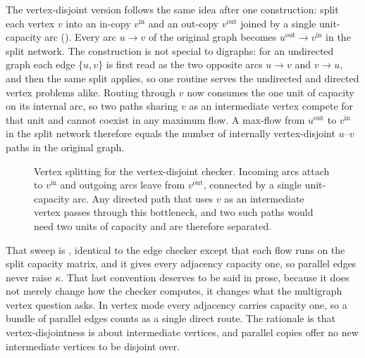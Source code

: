 The vertex-disjoint version follows the same idea after one construction: split each vertex $v$ into an in-copy $v^{\mathrm{in}}$ and an out-copy $v^{\mathrm{out}}$ joined by a single unit-capacity arc (). Every arc $u \to v$ of the original graph becomes $u^{\mathrm{out}} \to v^{\mathrm{in}}$ in the split network. The construction is not special to digraphs: for an undirected graph each edge $\{u,v\}$ is first read as the two opposite arcs $u \to v$ and $v \to u$, and then the same split applies, so one routine serves the undirected and directed vertex problems alike. Routing through $v$ now consumes the one unit of capacity on its internal arc, so two paths sharing $v$ as an intermediate vertex compete for that unit and cannot coexist in any maximum flow. A max-flow from $u^{\mathrm{out}}$ to $v^{\mathrm{in}}$ in the split network therefore equals the number of internally vertex-disjoint $u$--$v$ paths in the original graph.

\begin{figure}[ht]
\centering
{}
\caption{Vertex splitting for the vertex-disjoint checker. Incoming arcs attach to $v^{\mathrm{in}}$ and outgoing arcs leave from $v^{\mathrm{out}}$, connected by a single unit-capacity arc. Any directed path that uses $v$ as an intermediate vertex passes through this bottleneck, and two such paths would need two units of capacity and are therefore separated.}
\label{fig:vertex-split}
\end{figure}

That sweep is , identical to the edge checker except that each flow runs on the split capacity matrix, and it gives every adjacency capacity one, so parallel edges never raise $\kappa$. That last convention deserves to be said in prose, because it does not merely change how the checker computes, it changes what the multigraph vertex question asks. In vertex mode every adjacency carries capacity one, so a bundle of parallel edges counts as a single direct route. The rationale is that vertex-disjointness is about intermediate vertices, and parallel copies offer no new intermediate vertices to be disjoint over.


